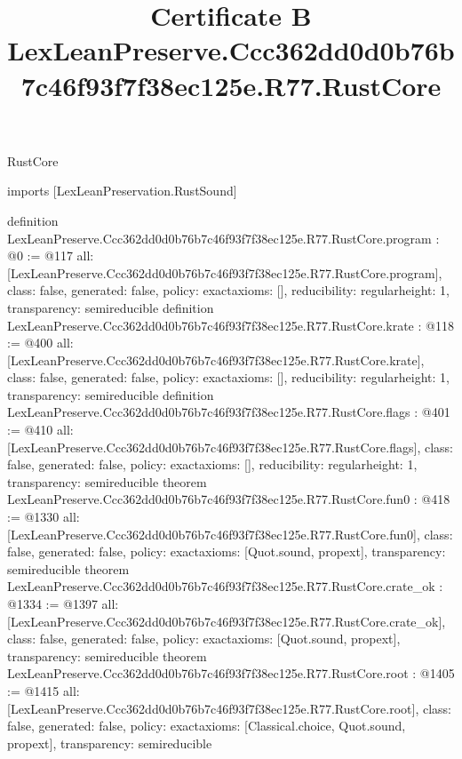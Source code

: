 \begin{lexlean}{RustCore}
\title{Certificate B LexLeanPreserve.Ccc362dd0d0b76b7c46f93f7f38ec125e.R77.RustCore}
\begin{coremodule}
imports [LexLeanPreservation.RustSound]

definition LexLeanPreserve.Ccc362dd0d0b76b7c46f93f7f38ec125e.R77.RustCore.program : @0 := @117 {
  all: [LexLeanPreserve.Ccc362dd0d0b76b7c46f93f7f38ec125e.R77.RustCore.program],
  class: false,
  generated: false,
  policy: exact{axioms: []},
  reducibility: regular{height: 1},
  transparency: semireducible
}
definition LexLeanPreserve.Ccc362dd0d0b76b7c46f93f7f38ec125e.R77.RustCore.krate : @118 := @400 {
  all: [LexLeanPreserve.Ccc362dd0d0b76b7c46f93f7f38ec125e.R77.RustCore.krate],
  class: false,
  generated: false,
  policy: exact{axioms: []},
  reducibility: regular{height: 1},
  transparency: semireducible
}
definition LexLeanPreserve.Ccc362dd0d0b76b7c46f93f7f38ec125e.R77.RustCore.flags : @401 := @410 {
  all: [LexLeanPreserve.Ccc362dd0d0b76b7c46f93f7f38ec125e.R77.RustCore.flags],
  class: false,
  generated: false,
  policy: exact{axioms: []},
  reducibility: regular{height: 1},
  transparency: semireducible
}
theorem LexLeanPreserve.Ccc362dd0d0b76b7c46f93f7f38ec125e.R77.RustCore.fun0 : @418 := @1330 {
  all: [LexLeanPreserve.Ccc362dd0d0b76b7c46f93f7f38ec125e.R77.RustCore.fun0],
  class: false,
  generated: false,
  policy: exact{axioms: [Quot.sound, propext]},
  transparency: semireducible
}
theorem LexLeanPreserve.Ccc362dd0d0b76b7c46f93f7f38ec125e.R77.RustCore.crate_ok : @1334 := @1397 {
  all: [LexLeanPreserve.Ccc362dd0d0b76b7c46f93f7f38ec125e.R77.RustCore.crate_ok],
  class: false,
  generated: false,
  policy: exact{axioms: [Quot.sound, propext]},
  transparency: semireducible
}
theorem LexLeanPreserve.Ccc362dd0d0b76b7c46f93f7f38ec125e.R77.RustCore.root : @1405 := @1415 {
  all: [LexLeanPreserve.Ccc362dd0d0b76b7c46f93f7f38ec125e.R77.RustCore.root],
  class: false,
  generated: false,
  policy: exact{axioms: [Classical.choice, Quot.sound, propext]},
  transparency: semireducible
}


\end{coremodule}
\end{lexlean}
